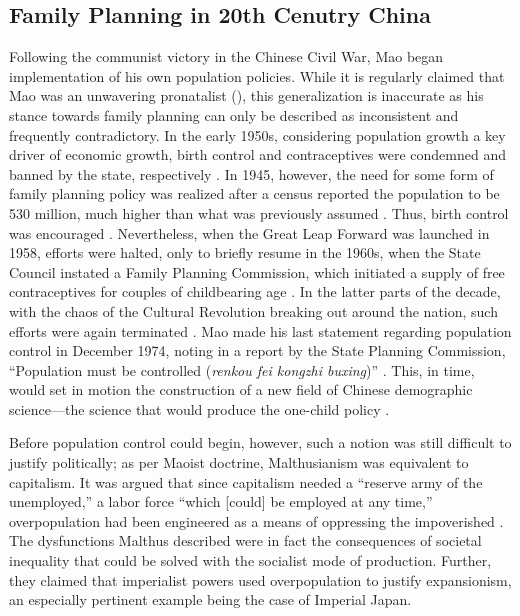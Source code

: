 \subsection{Family Planning in 20th Cenutry China}

Following the communist victory in the Chinese Civil War, Mao began implementation of his own population policies. While it is regularly claimed that Mao was an unwavering pronatalist (\cites{MaJian2013Guardian}{FongWang2022HRW}[pp.\ 35--52]{JisenMa1998PoliticsPopulationGrowth}), this generalization is inaccurate as his stance towards family planning can only be described as inconsistent and frequently contradictory. In the early 1950s, considering population growth a key driver of economic growth, birth control and contraceptives were condemned and banned by the state, respectively \autocite{Fitzpatrick2009TimeOneChild}. In 1945, however, the need for some form of family planning policy was realized after a census reported the population to be 530 million, much higher than what was previously assumed \autocite[pp.\ 7--8]{ZhangYangLiang2001}. Thus, birth control was encouraged \autocite[p.\ 53]{Greenhalgh2008JustOneChild}. Nevertheless, when the Great Leap Forward was launched in 1958, efforts were halted, only to briefly resume in the 1960s, when the State Council instated a Family Planning Commission, which initiated a supply of free contraceptives for couples of childbearing age \autocite[pp.\ 8--13]{Qian1983ChinaPopulationNewsletter}. In the latter parts of the decade, with the chaos of the Cultural Revolution breaking out around the nation, such efforts were again terminated \autocite[p.\ 53]{Greenhalgh2008JustOneChild}. Mao made his last statement regarding population control in December 1974, noting in a report by the State Planning Commission, “Population must be controlled (\emph{renkou fei kongzhi buxing})” \autocite[p.\ 54]{ZhangYangLiang2001}. This, in time, would set in motion the construction of a new field of Chinese demographic science---the science that would produce the one-child policy \autocite[pp.\ 68--60]{Greenhalgh2008JustOneChild}.

Before population control could begin, however, such a notion was still difficult to justify politically; as per Maoist doctrine, Malthusianism was equivalent to capitalism. It was argued that since capitalism needed a “reserve army of the unemployed,” a labor force “which [could] be employed at any time,” overpopulation had been engineered as a means of oppressing the impoverished \autocite[p.\ 938]{WangEtAl2016AJS}. The dysfunctions Malthus described were in fact the consequences of societal inequality that could be solved with the socialist mode of production. Further, they claimed that imperialist powers used overpopulation to justify expansionism, an especially pertinent example being the case of Imperial Japan.

